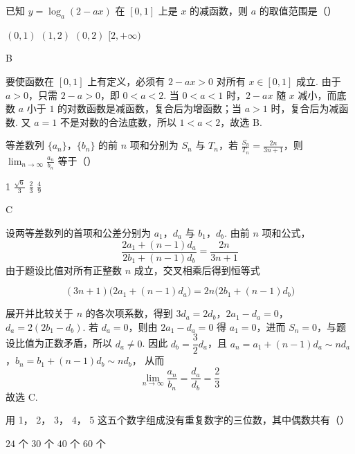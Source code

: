 \documentclass[UTF8,a4paper,oneside,11pt]{ctexbook}
\begin{document}
\begin{problem}
已知 \(y = \log_a(2 - ax) \) 在 \([0,1]\) 上是 \(x \) 的减函数，则 \(a \) 的取值范围是（\quad）

\choices
    {\((0,1)\)}
    {\((1,2)\)}
    {\((0,2)\)}
    {\([2, +\infty)\)}
\end{problem}

\begin{answer}
B
\end{answer}

\begin{solution}
要使函数在 \([0,1]\) 上有定义，必须有 \(2-ax>0\) 对所有 \(x\in[0,1]\) 成立. 由于 \(a>0\)，只需 \(2-a>0\)，即 \(0<a<2\). 当 \(0<a<1\) 时，\(2-ax\) 随 \(x\) 减小，而底数 \(a\) 小于 \(1\) 的对数函数是减函数，复合后为增函数；当 \(a>1\) 时，复合后为减函数. 又 \(a=1\) 不是对数的合法底数，所以 \(1<a<2\)，故选 B.
\end{solution}

\begin{problem}
等差数列 \(\{a_{n}\}\)，\(\{b_{n}\}\) 的前 \(n\) 项和分别为 \(S_{n}\) 与 \(T_{n}\)，若 \(\frac{S_{n}}{T_{n}} = \frac{2n}{3n+1}\)，则 \(\displaystyle\lim_{n \to \infty} \frac{a_{n}}{b_{n}}\) 等于（\quad）

\choices
    {1}
    {\(\frac{\sqrt{6}}{3} \)}
    {\(\frac{2}{3} \)}
    {\(\frac{4}{9} \)}
\end{problem}

\begin{answer}
C
\end{answer}

\begin{solution}
设两等差数列的首项和公差分别为 \(a_1\)，\(d_a\) 与 \(b_1\)，\(d_b\). 由前 \(n\) 项和公式，
\[
\frac{2a_1+(n-1)d_a}{2b_1+(n-1)d_b}=\frac{2n}{3n+1}
\]
由于题设比值对所有正整数 \(n\) 成立，交叉相乘后得到恒等式

\[
(3n+1)\bigl(2a_1+(n-1)d_a\bigr)=2n\bigl(2b_1+(n-1)d_b\bigr)
\]

展开并比较关于 \(n\) 的各次项系数，得到
\(3d_a=2d_b\)，\(2a_1-d_a=0\)，\(d_a=2\left(2b_1-d_b\right)\).
若 \(d_a=0\)，则由 \(2a_1-d_a=0\) 得 \(a_1=0\)，进而 \(S_n=0\)，与题设比值为正数矛盾，所以 \(d_a\ne0\). 因此 \(d_b=\dfrac32d_a\)，且
\(a_n=a_1+(n-1)d_a\sim nd_a\)，\(b_n=b_1+(n-1)d_b\sim nd_b\)，
从而
\[
\lim_{n\to\infty}\frac{a_n}{b_n}=\frac{d_a}{d_b}=\frac23
\]
故选 C.
\end{solution}

\begin{problem}
用 1， 2， 3， 4， 5 这五个数字组成没有重复数字的三位数，其中偶数共有（\quad）

\choices
    {\(24\text{ 个}\)}
    {\(30\text{ 个}\)}
    {\(40\text{ 个}\)}
    {\(60\text{ 个}\)}
\end{problem}
\end{document}

